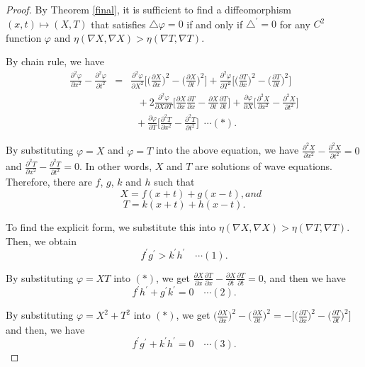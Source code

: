 \documentclass[a4paper,10pt]{amsart}
\theoremstyle{plain}
\newtheorem*{main theorem}{Theorem}
\theoremstyle{definition}
\begin{document}
\begin{proof}
By Theorem \ref{final}, it is sufficient to find a diffeomorphism
$(x,t) \mapsto (X,T)$ that satisfies $\triangle \varphi = 0$ if
and only if $\triangle^\prime = 0$ for any $C^2$ function
$\varphi$ and $\eta(\nabla X, \nabla X)
> \eta(\nabla T, \nabla T).$

By chain rule, we have
\begin{eqnarray*} \frac{\partial^2
\varphi}{\partial x^2} - \frac{\partial^2 \varphi}{\partial t^2}
&=& \frac{\partial^2 \varphi}{\partial X^2} \Big[ \Big(
\frac{\partial X}{\partial x} \Big)^2 - \Big(\frac{\partial
X}{\partial t} \Big)^2 \Big] + \frac{\partial^2 \varphi}{\partial
T^2} \Big[ \Big( \frac{\partial T}{\partial x} \Big)^2 - \Big(
\frac{\partial T}{\partial t} \Big)^2 \Big]\\
& & \,\,\,\, + 2 \frac{\partial^2 \varphi}{\partial X
\partial T} \Big[ \frac{\partial X}{\partial x} \frac{\partial
T}{\partial x} - \frac{\partial X}{\partial t} \frac{\partial
T}{\partial t} \Big] + \frac{\partial \varphi}{\partial X} \Big[
\frac{\partial^2 X}{\partial x^2} - \frac{\partial^2 X}{\partial
t^2} \Big]\\ & & \,\,\, + \frac{\partial \varphi}{\partial T}
\Big[ \frac{\partial^2 T}{\partial x^2} - \frac{\partial^2
T}{\partial t^2} \Big] \,\,\, \cdots (*).
\end{eqnarray*}


By substituting $\varphi = X$ and $\varphi = T$ into the above
equation, we have $\frac{\partial^2 X}{\partial x^2} -
\frac{\partial^2 X}{\partial t^2} = 0$ and $\frac{\partial^2
T}{\partial x^2} - \frac{\partial^2 T}{\partial t^2} = 0$. In
other words, $X$ and $T$ are solutions of wave equations.
Therefore, there are $f$, $g$, $k$ and $h$ such that
$$ \,\, \,\,\,\,\,\, X = f(x+t) + g(x-t), and $$
$$ T = k(x+t) + h(x-t).$$

To find the explicit form, we substitute this into $\eta(\nabla X,
\nabla X) > \eta(\nabla T, \nabla T).$ Then, we obtain $$f^\prime
g^\prime > k^\prime h^\prime \,\,\,\,\,\, \cdots (1).$$

By substituting $\varphi = XT$ into $(*)$, we get $\frac{\partial
X}{\partial x} \frac{\partial T}{\partial x} - \frac{\partial
X}{\partial t} \frac{\partial T}{\partial t} = 0$, and then we
have
$$ f^\prime h^\prime + g^\prime k^\prime = 0 \,\,\,\,\,\, \cdots
(2).$$



By substituting $\varphi = X^2 + T^2$ into $(*)$, we get $\Big(
\frac{\partial X}{\partial x} \Big)^2 - \Big( \frac{\partial
X}{\partial t} \Big)^2 = - \Big[ \Big( \frac{\partial T}{\partial
x} \Big)^2 - \Big( \frac{\partial T}{\partial t} \Big)^2 \Big]$
and then, we have
$$ f^\prime g^\prime + k^\prime h^\prime = 0 \,\,\,\,\,\, \cdots (3).$$


\end{proof}
\end{document}
